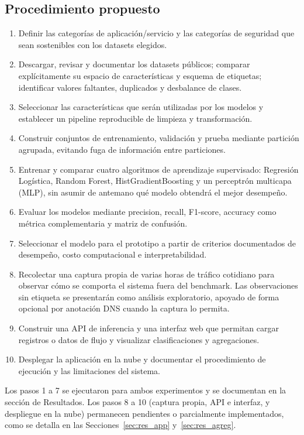 \documentclass[conference]{IEEEtran}
\begin{document}
\subsection{Procedimiento propuesto}
\begin{enumerate}
\item Definir las categorías de aplicación/servicio y las categorías de seguridad que sean sostenibles con los datasets elegidos.
\item Descargar, revisar y documentar los datasets públicos; comparar explícitamente su espacio de características y esquema de etiquetas; identificar valores faltantes, duplicados y desbalance de clases.
\item Seleccionar las características que serán utilizadas por los modelos y establecer un pipeline reproducible de limpieza y transformación.
\item Construir conjuntos de entrenamiento, validación y prueba mediante partición agrupada, evitando fuga de información entre particiones.
\item Entrenar y comparar cuatro algoritmos de aprendizaje supervisado: Regresión Logística, Random Forest, HistGradientBoosting y un perceptrón multicapa (MLP), sin asumir de antemano qué modelo obtendrá el mejor desempeño.
\item Evaluar los modelos mediante precision, recall, F1-score, accuracy como métrica complementaria y matriz de confusión.
\item Seleccionar el modelo para el prototipo a partir de criterios documentados de desempeño, costo computacional e interpretabilidad.
\item Recolectar una captura propia de varias horas de tráfico cotidiano para observar cómo se comporta el sistema fuera del benchmark. Las observaciones sin etiqueta se presentarán como análisis exploratorio, apoyado de forma opcional por anotación DNS cuando la captura lo permita.
\item Construir una API de inferencia y una interfaz web que permitan cargar registros o datos de flujo y visualizar clasificaciones y agregaciones.
\item Desplegar la aplicación en la nube y documentar el procedimiento de ejecución y las limitaciones del sistema.
\end{enumerate}
Los pasos 1 a 7 se ejecutaron para ambos experimentos y se documentan en la sección de Resultados. Los pasos 8 a 10 (captura propia, API e interfaz, y despliegue en la nube) permanecen pendientes o parcialmente implementados, como se detalla en las Secciones~\ref{sec:res_app} y~\ref{sec:res_agreg}.
\end{document}
